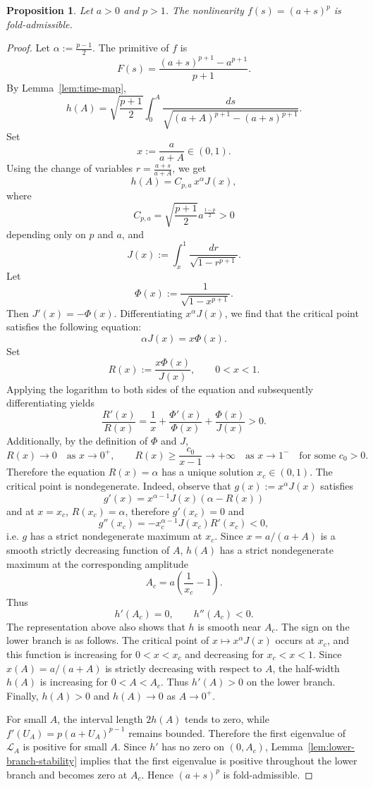 \documentclass[reqno,12pt]{amsart}
\numberwithin{equation}{section}
\newtheorem{proposition}[theorem]{Proposition}
\theoremstyle{remark}
\begin{document}
\begin{proposition} \label{prop:power-fold}
Let $a>0$ and $p>1$.  The nonlinearity
$f(s)=(a+s)^p$ is fold-admissible.
\end{proposition}

\begin{proof}
Let
$\alpha:=\frac{p-1}{2}.$
The primitive of $f$ is
$$
F(s)=\frac{(a+s)^{p+1}-a^{p+1}}{p+1}.
$$
By Lemma~\ref{lem:time-map},
$$
h(A)=\sqrt{\frac{p+1}{2}}
\int_0^A
\frac{ds}{\sqrt{(a+A)^{p+1}-(a+s)^{p+1}}}.
$$
Set
$$
x:=\frac{a}{a+A}\in(0,1).
$$
Using the change of variables $r=\frac{a+s}{a+A}$, we get
$$
h(A)=C_{p,a}\,x^\alpha J(x),
$$
where 
$$C_{p,a}=\sqrt{\frac {p+1}2} a^{\frac {1-p}2}>0$$
depending only on $p$ and $a$, and
$$
J(x):=\int_x^1\frac{dr}{\sqrt{1-r^{p+1}}}.
$$
Let
$$
\Phi(x):=\frac{1}{\sqrt{1-x^{p+1}}}.
$$
Then $J'(x)=-\Phi(x)$.  Differentiating $x^\alpha J(x)$, we find that the critical point satisfies the following equation: 
$$
\alpha J(x)=x\Phi(x).
$$
Set
$$
R(x):=\frac{x\Phi(x)}{J(x)},
\qquad 0<x<1.
$$
Applying the logarithm to both sides of the equation and subsequently differentiating yields
$$
\frac{R'(x)}{R(x)}
=\frac{1}{x}+\frac{\Phi'(x)}{\Phi(x)}+\frac{\Phi(x)}{J(x)}>0.
$$
Additionally, by the definition of $\Phi$ and $J$,
$$
R(x)\to0\quad\text{as }x \to 0^+,
\qquad
R(x)\ge \frac{c_0}{x-1}\to+\infty\quad\text{as }x\to 1^- \quad \text{for some $c_0>0$}.
$$
Therefore the equation $R(x)=\alpha$ has a unique solution $x_c\in(0,1)$.
The critical point is nondegenerate.  Indeed, observe that $g(x):=x^\alpha J(x)$ satisfies
$$g'(x)= x^{\alpha-1} J(x)(\alpha-R(x))$$
and at $x=x_c$, $R(x_c)=\alpha$, therefore $g'(x_c)=0$ and
$$g''(x_c)= -x_c^{\alpha-1} J(x_c)R'(x_c)<0,$$
i.e. $g$ has a strict nondegenerate maximum at $x_c$.  Since $x=a/(a+A)$ is a smooth strictly decreasing
function of $A$, $h(A)$  has a strict nondegenerate maximum at the corresponding amplitude
$$
A_c=a\left(\frac1{x_c}-1\right).
$$
Thus
$$
h'(A_c)=0,
\qquad
h''(A_c)<0.
$$
The representation above also shows that $h$ is smooth near $A_c$.  The sign
on the lower branch is as follows.  The critical point of $x\mapsto x^\alpha
J(x)$ occurs at $x_c$, and this function is increasing for $0<x<x_c$ and
decreasing for $x_c<x<1$.  Since $x(A)=a/(a+A)$ is strictly decreasing with respect to $A$, the
half-width $h(A)$ is increasing for $0<A<A_c$.  Thus $h'(A)>0$ on the lower
branch.  Finally, $h(A)>0$ and $h(A)\to0$ as $A\to 0^+$.

For small $A$, the interval length $2h(A)$ tends to zero, while
$f'(U_A)=p(a+U_A)^{p-1}$ remains bounded.  Therefore the first eigenvalue
of $\mathcal L_A$ is positive for small $A$.  Since $h'$ has no zero on
$(0,A_c)$, Lemma~\ref{lem:lower-branch-stability} implies that the first
eigenvalue is positive throughout the lower branch and becomes zero at
$A_c$.  Hence $(a+s)^p$ is fold-admissible.
\end{proof}
\end{document}
